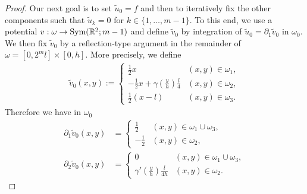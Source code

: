 \documentclass[a4paper, 10pt, twoside, notitlepage]{amsart}
\theoremstyle{plain}
\newcommand{\R}{\mathbb{R}}
\newcommand{\p}{\partial}
\begin{document}
\begin{proof}
			Our next goal is to set $\tilde{u}_0 = f$ and then to iteratively fix the other components such that $\tilde{u}_k = 0$ for $k\in \{1,\dots,m-1\}$.  To this end, we use a potential
			$v: \omega \to \textup{Sym}(\R^2;m-1)$ and define $\tilde{v}_0$ by integration of $\tilde{u}_0 = \p_1 \tilde{v}_0$ in $\omega_0$. We then fix $\tilde{v}_0$ by a reflection-type argument in the remainder of $\omega = [0,2^ml]\times [0,h]$.
                        More precisely, we define
			\begin{align*}
				\tilde{v}_0(x,y) := \begin{cases}
                                                          \frac{1}{2} x & (x,y) \in \omega_1, \\
                                                          - \frac{1}{2} x + \gamma(\frac{y}{h}) \frac{l}{4} & (x,y) \in \omega_2, \\
                                                          \frac{1}{2} (x-l) & (x,y) \in \omega_3.
				\end{cases}
			\end{align*}
                        Therefore we have in $\omega_0$
			\begin{align*}
				\p_1 \tilde{v}_0(x,y) & = \begin{cases} \frac{1}{2} & (x,y) \in \omega_1 \cup \omega_3, \\ - \frac{1}{2} & (x,y) \in \omega_2, \end{cases}\\
				\p_2 \tilde{v}_0(x,y) & = \begin{cases} 0 & (x,y) \in \omega_1 \cup \omega_3, \\ \gamma'(\frac{y}{h}) \frac{l}{4h} & (x,y) \in \omega_2. \end{cases}
			\end{align*}
			

\end{proof}
\end{document}
